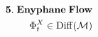 \documentclass[preview]{standalone}
\begin{document}
\begin{align*}
\special{dvisvgm:raw <g id='unique000'>}\mathbf{5.\;Enyphane\;Flow}\\\Phi_t^X\in\operatorname{Diff}(\mathcal{M})\special{dvisvgm:raw </g>}
\end{align*}
\end{document}

